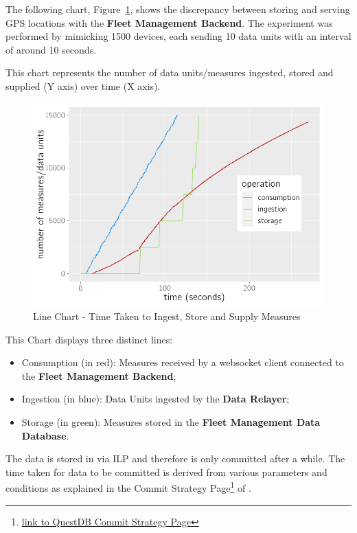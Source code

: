 The following chart, Figure~\ref{fig:evaluation:overview:servicedatabase:chart:s4}, shows the discrepancy between storing and serving GPS locations with the \textbf{Fleet Management Backend}. The experiment was performed by mimicking 1500 devices, each sending 10 data units with an interval of around 10 seconds.

This chart represents the number of data units/measures ingested, stored and supplied (Y axis) over time (X axis).

\begin{figure}[H]
    \centering
    \includegraphics[page=1]{assets/charts/s4.pdf}
    \caption[Line Chart - Time Taken to Ingest, Store and Supply Measures]{Line Chart - Time Taken to Ingest, Store and Supply Measures}
    \label{fig:evaluation:overview:servicedatabase:chart:s4}
\end{figure}

This Chart displays three distinct lines:

\begin{itemize}
    \item Consumption (in red): Measures received by a websocket client connected to the \textbf{Fleet Management Backend};
    \item Ingestion (in blue): Data Units ingested by the \textbf{Data Relayer};
    \item Storage (in green): Measures stored in the \textbf{Fleet Management Data Database}.
\end{itemize}

The data is stored in  via \gls{ILP} and therefore is only committed after a while. The time taken for data to be committed is derived from various parameters and conditions as explained in the Commit Strategy Page\footnote{\href {https://questdb.io/docs/reference/api/ilp/tcp-receiver/\#commit-strategy}{link to QuestDB Commit Strategy Page}} of .

